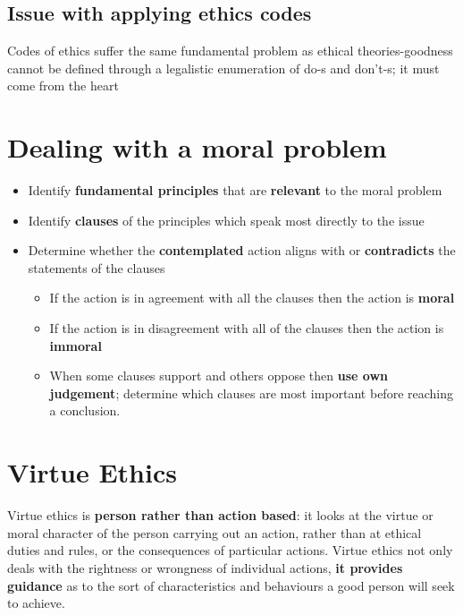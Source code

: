 \documentclass{article}
\begin{document}
\subsection{Issue with applying ethics codes}
\begin{flushleft}
Codes of ethics suffer the same fundamental problem as ethical theories-goodness cannot be defined through a legalistic enumeration of do-s and don't-s; it must come from the heart
\end{flushleft}

\section{Dealing with a moral problem}

\begin{itemize}
  \item Identify \textbf{fundamental principles} that are \textbf{relevant} to the moral problem
  \item Identify \textbf{clauses} of the principles which speak most directly to the issue
  \item Determine whether the \textbf{contemplated} action aligns with or \textbf{contradicts} the statements of the clauses
  \begin{itemize}
    \item If the action is in agreement with all the clauses then the action is \textbf{moral}
    \item If the action is in disagreement with all of the clauses then the action is \textbf{immoral}
    \item When some clauses support and others oppose then \textbf{use own judgement}; determine which clauses are most important before reaching a conclusion.
  \end{itemize}
\end{itemize}

\section{Virtue Ethics}

\begin{flushleft}
Virtue ethics is \textbf{person rather than action based}: it looks at the virtue or moral character of the person carrying out an action, rather than at ethical duties and rules, or the consequences of particular actions. Virtue ethics not only deals with the rightness or wrongness of individual actions, \textbf{it provides guidance} as to the sort of characteristics and behaviours a good person will seek to achieve.
\end{flushleft}
\end{document}
